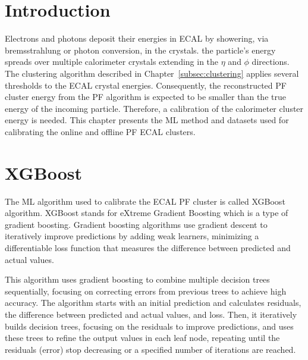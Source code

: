 
\section{Introduction}
Electrons and photons deposit their energies in ECAL by showering, via bremsstrahlung or photon conversion, in the crystals.
the particle's energy spreads over multiple calorimeter crystals extending in the $\eta$ and $\phi$ directions.
The clustering algorithm described in Chapter~\ref{subsec:clustering} applies several thresholds to the ECAL crystal energies. Consequently,
the reconstructed PF cluster energy from the PF algorithm is expected to be smaller than the true energy of the incoming particle.
Therefore, a calibration of the calorimeter cluster energy is needed.
This chapter presents the ML method and datasets used for calibrating the online and offline PF ECAL clusters.

\section{XGBoost} %

The ML algorithm used to calibrate the ECAL PF cluster is called XGBoost algorithm.
XGBoost stands for eXtreme Gradient Boosting which is a type of gradient boosting.
Gradient boosting algorithms use gradient descent to iteratively improve predictions by adding weak learners, minimizing a differentiable loss function that measures the difference between predicted and actual values.

This algorithm
uses gradient boosting to combine multiple decision trees sequentially, focusing on correcting errors from previous trees to achieve high accuracy.
The algorithm starts with an initial prediction and calculates residuals, the difference between predicted and actual values, and loss.
Then, it iteratively builds decision trees, focusing on the residuals to improve predictions, and uses these trees to refine the output values in each leaf node, repeating until the residuals (error) stop decreasing or a specified number of iterations are reached.


